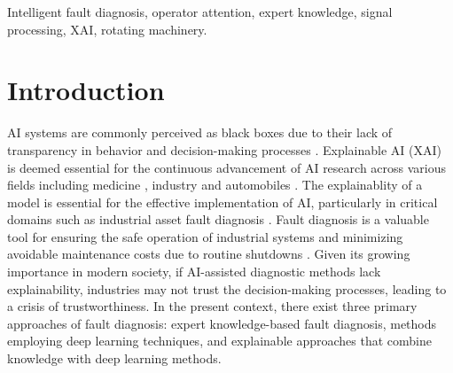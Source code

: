 \documentclass[lettersize,journal]{IEEEtran}
\begin{document}
\begin{IEEEkeywords}
Intelligent fault diagnosis, operator attention, expert knowledge, signal processing, XAI, rotating machinery.
\end{IEEEkeywords}


\section{Introduction}

 AI systems are commonly perceived as black boxes due to their lack of transparency in behavior and decision-making processes  \cite{Rong2024}. Explainable AI (XAI) is deemed essential for the continuous advancement of AI research across various fields including medicine \cite{Holzinger2022}, industry \cite{Li2023} and automobiles \cite{Dong2023}. The explainablity of a model is essential for the effective implementation of AI, particularly in critical domains such as industrial asset fault diagnosis \cite{Li2024}. Fault diagnosis is a valuable tool for ensuring the safe operation of industrial systems and minimizing avoidable maintenance costs due to routine shutdowns \cite{henriquezReviewAutomaticFault2014, wang_coarse--fine_2023}. Given its growing importance in modern society, if AI-assisted diagnostic methods lack explainability, industries may not trust the decision-making processes, leading to a crisis of trustworthiness. In the present context, there exist three primary approaches of fault diagnosis: expert knowledge-based fault diagnosis, methods employing deep learning techniques, and explainable approaches that combine knowledge with deep learning methods. 

 

\end{document}
